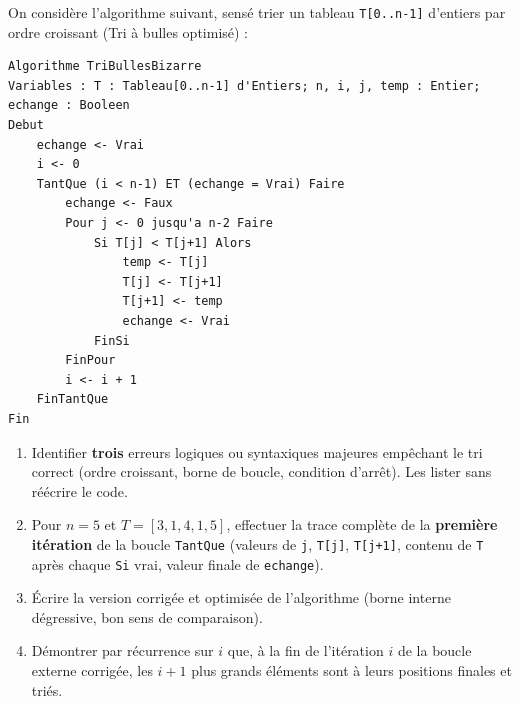 \documentclass[11pt]{article}
\begin{document}
\begin{exercice}
On considère l'algorithme suivant, sensé trier un tableau \texttt{T[0..n-1]} d'entiers par ordre croissant (Tri à bulles optimisé) :
\begin{verbatim}
Algorithme TriBullesBizarre
Variables : T : Tableau[0..n-1] d'Entiers; n, i, j, temp : Entier; echange : Booleen
Debut
    echange <- Vrai
    i <- 0
    TantQue (i < n-1) ET (echange = Vrai) Faire
        echange <- Faux
        Pour j <- 0 jusqu'a n-2 Faire
            Si T[j] < T[j+1] Alors
                temp <- T[j]
                T[j] <- T[j+1]
                T[j+1] <- temp
                echange <- Vrai
            FinSi
        FinPour
        i <- i + 1
    FinTantQue
Fin
\end{verbatim}
\begin{enumerate}
    \item Identifier \textbf{trois} erreurs logiques ou syntaxiques majeures empêchant le tri correct (ordre croissant, borne de boucle, condition d'arrêt). Les lister sans réécrire le code.
    \item Pour $n=5$ et $T = [3, 1, 4, 1, 5]$, effectuer la trace complète de la \textbf{première itération} de la boucle \texttt{TantQue} (valeurs de \texttt{j}, \texttt{T[j]}, \texttt{T[j+1]}, contenu de \texttt{T} après chaque \texttt{Si} vrai, valeur finale de \texttt{echange}).
    \item Écrire la version corrigée et optimisée de l'algorithme (borne interne dégressive, bon sens de comparaison).
    \item Démontrer par récurrence sur $i$ que, à la fin de l'itération $i$ de la boucle externe corrigée, les $i+1$ plus grands éléments sont à leurs positions finales et triés.
\end{enumerate}
\end{exercice}
\end{document}
